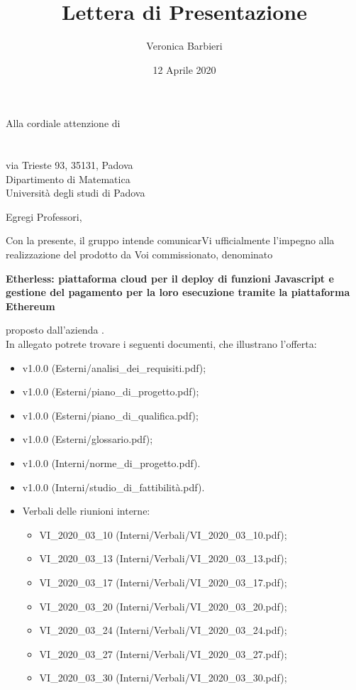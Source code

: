 \documentclass[a4paper]{letter}
\title{Lettera di Presentazione}
\author{Veronica Barbieri}
\begin{document}
\begin{letter} {Alla cordiale attenzione di \\ \TV \\ \RC \\ via Trieste 93, 35131, Padova\\ Dipartimento di Matematica \\ Università degli studi di Padova }
  \vspace*{-0.4\baselineskip}
\date{12 Aprile 2020}
\opening{Egregi Professori,}
  Con la presente, il gruppo \Gruppo{} intende comunicarVi ufficialmente l'impegno alla realizzazione del prodotto da Voi commissionato, denominato
  \begin{center}
    \textbf{Etherless: piattaforma cloud per il deploy di funzioni Javascript e gestione del pagamento per la loro esecuzione tramite la piattaforma Ethereum}
  \end{center}
  proposto dall'azienda \Proponente.\\
  In allegato potrete trovare i seguenti documenti, che illustrano l'offerta:
  \begin{itemize}
    \item \AdR{} v1.0.0 (Esterni/analisi\_dei\_requisiti.pdf);
    \item \PdP{} v1.0.0 (Esterni/piano\_di\_progetto.pdf);
    \item \PdQ{} v1.0.0 (Esterni/piano\_di\_qualifica.pdf);
    \item \Glossario{} v1.0.0 (Esterni/glossario.pdf);
    \item \NdP{} v1.0.0 (Interni/norme\_di\_progetto.pdf).
    \item \SdF{} v1.0.0 (Interni/studio\_di\_fattibilità.pdf).
    \item Verbali delle riunioni interne:
      \begin{itemize}
        \item VI\_2020\_03\_10 (Interni/Verbali/VI\_2020\_03\_10.pdf);
        \item VI\_2020\_03\_13 (Interni/Verbali/VI\_2020\_03\_13.pdf);
        \item VI\_2020\_03\_17 (Interni/Verbali/VI\_2020\_03\_17.pdf);
        \item VI\_2020\_03\_20 (Interni/Verbali/VI\_2020\_03\_20.pdf);
        \item VI\_2020\_03\_24 (Interni/Verbali/VI\_2020\_03\_24.pdf);
        \item VI\_2020\_03\_27 (Interni/Verbali/VI\_2020\_03\_27.pdf);
        \item VI\_2020\_03\_30 (Interni/Verbali/VI\_2020\_03\_30.pdf);

\end{itemize}
\end{itemize}
\end{letter}
\end{document}
